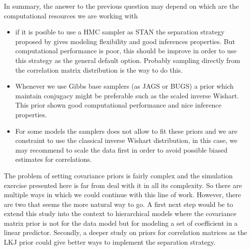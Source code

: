 \documentclass{article}
\begin{document}
In summary, the answer to the previous question may depend on which are the computational resources we are working with 

\begin{itemize}
\item  if it is posible to use a HMC sampler as STAN the separation strategy proposed by \cite{banard2000} gives modeling flexibility and good inferences properties. But computational performance is poor, this should be improve in order to use this strategy as the general default option. Probably sampling directly from the correlation matrix distribution is the way to do this. 

\item Whenever we use Gibbs base samplers (as JAGS or BUGS) a prior which maintain conjugacy might be preferable such as the scaled inverse Wishart. This prior shown good computational performance and nice inference properties.  

\item For some models the samplers does not allow to fit these priors and we are constraint to use the classical inverse Wishart distribution, in this case, we may recommend to scale the data first in order to avoid possible biased estimates for correlations. 
\end{itemize}

The problem of setting covariance priors is fairly complex and the simulation exercise presented here is far from deal with it in all its complexity. So there are multiple ways in which we could continue with this line of work. However, there are two that seems the more natural way to go. A first next step would be to extend this study into the context to hierarchical models where the covariance matrix prior is not for the data model but for modeling a set of coefficient in a linear predictor. Secondly, a deeper study on priors for correlation matrices as the LKJ prior could give better ways to implement the separation strategy. 

      
      
\end{document}
